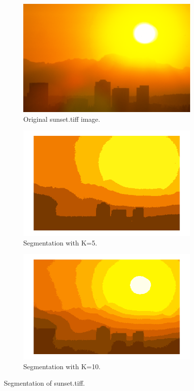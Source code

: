 \documentclass[12pt]{report}
\begin{document}
\begin{enumerate}
  \begin{figure}[H]
    \centering
    \begin{subfigure}{0.48\linewidth}
      \includegraphics[width=\linewidth]{sunset.png}
      \caption{Original sunset.tiff image.}
    \end{subfigure}
    \begin{subfigure}{0.55\linewidth}
      \includegraphics[width=\linewidth]{1a5.png}
      \caption{Segmentation with K=5.}
    \end{subfigure}
    \begin{subfigure}{0.55\linewidth}
      \includegraphics[width=\linewidth]{1a10.png}
      \caption{Segmentation with K=10.}
    \end{subfigure}
    \caption{Segmentation of sunset.tiff.}
  \end{figure}


\end{enumerate}
\end{document}
